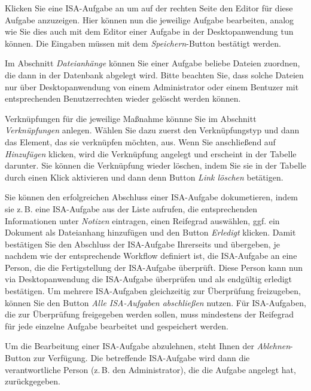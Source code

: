 \documentclass[a4paper,10pt]{book}
\begin{document}
Klicken Sie eine ISA-Aufgabe an um auf der rechten Seite den Editor für diese
Aufgabe anzuzeigen. Hier können nun die jeweilige Aufgabe bearbeiten, analog wie
Sie dies auch mit dem Editor einer Aufgabe in der Desktopanwendung tun
können. Die Eingaben müssen mit dem \textit{Speichern}-Button bestätigt werden.

Im Abschnitt \textit{Dateianhänge} können Sie einer Aufgabe beliebe Dateien
zuordnen, die dann in der Datenbank abgelegt wird. Bitte beachten Sie, dass
solche Dateien nur über Desktopanwendung von einem Administrator oder einem
Bentuzer mit entsprechenden Benutzerrechten wieder gelöscht werden können.

Verknüpfungen für die jeweilige Maßnahme könnne Sie im Abschnitt
\textit{Verknüpfungen} anlegen. Wählen Sie dazu zuerst den Verknüpfungstyp und
dann das Element, das sie verknüpfen möchten, aus. Wenn Sie anschließend auf
\textit{Hinzufügen} klicken, wird die Verknüpfung angelegt und erscheint in der
Tabelle darunter. Sie können die Verknüpfung wieder löschen, indem Sie sie in
der Tabelle durch einen Klick aktivieren und dann denn Button \textit{Link
löschen} betätigen.

Sie können den erfolgreichen Abschluss einer ISA-Aufgabe dokumetieren, indem sie
z.\,B. eine ISA-Aufgabe aus der Liste aufrufen, die entsprechenden Informationen
unter \textit{Notizen} eintragen, einen Reifegrad auswählen, ggf. ein Dokument
als Dateianhang hinzufügen und den Button \textit{Erledigt} klicken. Damit
bestätigen Sie den Abschluss der ISA-Aufgabe Ihrerseits und übergeben, je
nachdem wie der entsprechende Workflow definiert ist, die ISA-Aufgabe an eine
Person, die die Fertigstellung der ISA-Aufgabe überprüft. Diese Person kann nun
via Desktopanwendung die ISA-Aufgabe überprüfen und als endgültig erledigt
bestätigen. Um mehrere ISA-Aufgaben gleichzeitig zur Überprüfung freizugeben,
können Sie den Button \textit{Alle ISA-Aufgaben abschließen} nutzen. Für
ISA-Aufgaben, die zur Überprüfung freigegeben werden sollen, muss mindestens der
Reifegrad für jede einzelne Aufgabe bearbeitet und gespeichert werden.

Um die Bearbeitung einer ISA-Aufgabe abzulehnen, steht Ihnen der
\textit{Ablehnen}-Button zur Verfügung. Die betreffende ISA-Aufgabe wird dann
die verantwortliche Person (z.\,B. den Administrator), die die Aufgabe angelegt
hat, zurückgegeben.
\end{document}
